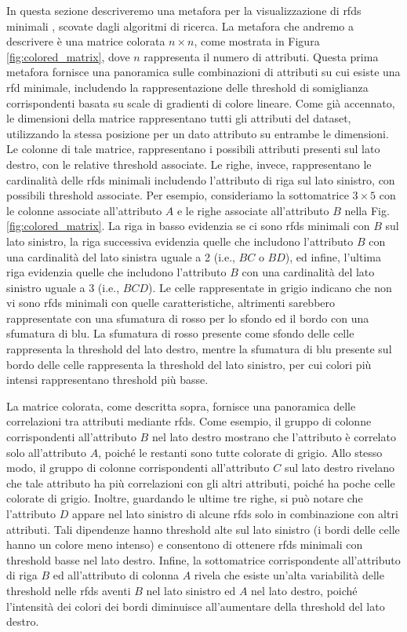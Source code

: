 In questa sezione descriveremo una metafora per la visualizzazione di \acrshort{rfds} minimali \cite{mdvisualization}, scovate dagli algoritmi di ricerca. La metafora che andremo a descrivere \`{e} una matrice colorata $n\times n$, come mostrata in Figura \ref{fig:colored_matrix}, dove $n$ rappresenta il numero di attributi. Questa prima metafora fornisce una panoramica sulle combinazioni di attributi su cui esiste una \acrshort{rfd} minimale, includendo la rappresentazione delle threshold di somiglianza corrispondenti basata su scale di gradienti di colore lineare. Come gi\`{a} accennato, le dimensioni della matrice rappresentano tutti gli attributi del dataset, utilizzando la stessa posizione per un dato attributo su entrambe le dimensioni. Le colonne di tale matrice, rappresentano i possibili attributi presenti sul lato destro, con le relative threshold associate. Le righe, invece, rappresentano le cardinalit\`{a} delle \acrshort{rfds} minimali includendo l'attributo di riga sul lato sinistro, con possibili threshold associate. Per esempio, consideriamo la sottomatrice $3\times5$ con le colonne associate all'attributo $A$ e le righe associate all'attributo $B$ nella Fig. \ref{fig:colored_matrix}. La riga in basso evidenzia se ci sono \acrshort{rfds} minimali con $B$ sul lato sinistro, la riga successiva evidenzia quelle che includono l'attributo $B$ con una cardinalit\`{a} del lato sinistra uguale a 2 (i.e., $BC$ o $BD$), ed infine, l'ultima riga evidenzia quelle che includono l'attributo $B$ con una cardinalit\`{a} del lato sinistro uguale a 3 (i.e., $BCD$). Le celle rappresentate in grigio indicano che non vi sono \acrshort{rfds} minimali con quelle caratteristiche, altrimenti sarebbero rappresentate con una sfumatura di rosso per lo sfondo ed il bordo con una sfumatura di blu. La sfumatura di rosso presente come sfondo delle celle rappresenta la threshold del lato destro, mentre la sfumatura di blu presente sul bordo delle celle rappresenta la threshold del lato sinistro, per cui colori pi\`{u} intensi rappresentano threshold pi\`{u} basse.\par
La matrice colorata, come descritta sopra, fornisce una panoramica delle correlazioni tra attributi mediante \acrfull{rfds}. Come esempio, il gruppo di colonne corrispondenti all'attributo $B$ nel lato destro mostrano che l'attributo \`{e} correlato solo all'attributo $A$, poich\'{e} le restanti sono tutte colorate di grigio. Allo stesso modo, il gruppo di colonne corrispondenti all'attributo $C$ sul lato destro rivelano che tale attributo ha pi\`{u} correlazioni con gli altri attributi, poich\'{e} ha poche celle colorate di grigio. Inoltre, guardando le ultime tre righe, si pu\`{o} notare che l'attributo $D$ appare nel lato sinistro di alcune \acrfull{rfds} solo in combinazione con altri attributi. Tali dipendenze hanno threshold alte sul lato sinistro (i bordi delle celle hanno un colore meno intenso) e consentono di ottenere \acrfull{rfds} minimali con threshold basse nel lato destro. Infine, la sottomatrice corrispondente all'attributo di riga $B$ ed all'attributo di colonna $A$ rivela che esiste un'alta variabilit\`{a} delle threshold nelle \acrfull{rfds} aventi $B$ nel lato sinistro ed $A$ nel lato destro, poich\'{e} l'intensit\`{a} dei colori dei bordi diminuisce all'aumentare della threshold del lato destro.
